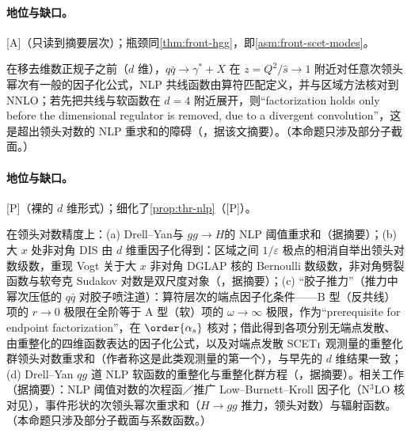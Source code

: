 \paragraph{地位与缺口。}[A]（只读到摘要层次）；瓶颈同\cref{thm:front-hgg}，即\cref{asm:front-scet-modes}。

\begin{proposition}\label{prop:front-nlp-threshold}
在移去维数正规子之前（$d$ 维），$q\bar q\to\gamma^*+X$ 在 $z=Q^2/\hat s\to1$ 附近对任意次领头幂次有一般的因子化公式，NLP 共线函数由算符匹配定义，并与区域方法核对到 NNLO；若先把共线与软函数在 $d=4$ 附近展开，则“factorization holds only before the dimensional regulator is removed, due to a divergent convolution”，这是超出领头对数的 NLP 重求和的障碍（\cite{Beneke:2019oqx}，据该文摘要）。（本命题只涉及部分子截面。）
\end{proposition}

\paragraph{地位与缺口。}[P]（裸的 $d$ 维形式）；细化了\cref{prop:thr-nlp}（[P]）。

\begin{proposition}\label{prop:front-nlp-ll}
在领头对数精度上：(a) Drell--Yan\cite{Beneke:2018gvs}与 $gg\to H$\cite{Beneke:2019mua}的 NLP 阈值重求和（据摘要）；(b) 大 $x$ 处非对角 DIS 由 $d$ 维重因子化得到：区域之间 $1/\varepsilon$ 极点的相消自举出领头对数级数，重现 Vogt 关于大 $x$ 非对角 DGLAP 核的 Bernoulli 数级数，非对角劈裂函数与软夸克 Sudakov 对数是双尺度对象（\cite{Beneke:2020ibj}，据摘要）；(c) “胶子推力”（推力中幂次压低的 $q\bar q$ 对胶子喷注道）：算符层次的端点因子化条件——B 型（反共线）项的 $r\to0$ 极限在全阶等于 A 型（软）项的 $\omega\to\infty$ 极限，作为“prerequisite for endpoint factorization”，在 $\order{\alpha_s}$ 核对；借此得到各项分别无端点发散、由重整化的四维函数表达的因子化公式，以及对端点发散 SCET$_{\rm I}$ 观测量的重整化群领头对数重求和（作者称这是此类观测量的第一个），与早先的 $d$ 维结果一致\cite[第~1--2、4~节]{Beneke:2022obx}；(d) Drell--Yan $qg$ 道 NLP 软函数的重整化与重整化群方程（\cite{Beneke:2025ufd}，据摘要）。相关工作（据摘要）：NLP 阈值对数的次程函／推广 Low--Burnett--Kroll 因子化\cite{Bonocore:2015esa,Bonocore:2016awd}（N$^3$LO 核对见\cite{Bahjat-Abbas:2018hpv}），事件形状的次领头幂次重求和（$H\to gg$ 推力，领头对数\cite{Moult:2018jjd}）与辐射函数\cite{Moult:2019mog}。（本命题只涉及部分子截面与系数函数。）
\end{proposition}

